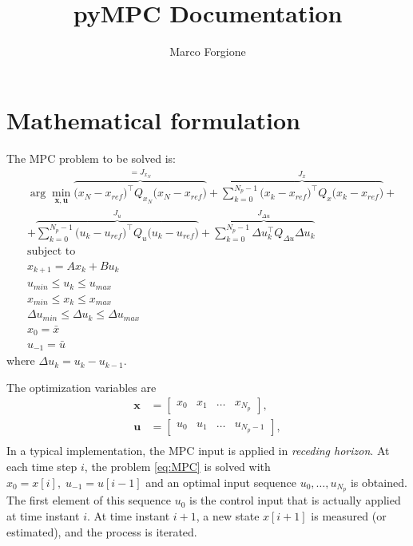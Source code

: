 \documentclass[a4paper,12pt,fleqn]{book}
\newcommand{\varx}{\mathbf{x}}
\newcommand{\varu}{\mathbf{u}}
\newcommand{\QxN}{Q_{x_N}}
\newcommand{\Qx}{Q_{x}}
\newcommand{\Qu}{Q_{u}}
\newcommand{\Qdu}{Q_{\Delta u}}
\newcommand{\Np}{{N_p}}
\begin{document}
 \title{pyMPC Documentation}
\author{Marco Forgione}

\maketitle

\chapter{Mathematical formulation}
The MPC problem to be solved is:
\begin{subequations}
\label{eq:MPC}
\begin{align}
  &\arg \min_{\varx,\varu} 
  \overbrace{\big(x_N - x_{ref}\big)^\top \QxN \big(x_N - x_{ref}\big)}^{=J_{x_N}} + 
  \overbrace{\sum_{k=0}^{\Np-1} \big(x_k - x_{ref}\big)^\top \Qx\big(x_k - x_{ref}\big)}^{J_{x}}+ \nonumber \\
  &  + 
    \overbrace{\sum_{k=0}^{\Np-1} \big(u_k - u_{ref}\big)^\top \Qu \big(u_k - u_{ref}\big)}^{J_u}
    +  
  \overbrace{\sum_{k=0}^{\Np-1} \Delta u_k^\top \Qdu \Delta u_k}^{J_{\Delta u}} \\ \nonumber
  &\text{subject to} \nonumber\\
  &x_{k+1} = Ax_k + B u_k \label{eq:linear_dynamics} \\ 
  &u_{min} \leq u_k \leq u_{max}\\
  &x_{min} \leq x_k \leq x_{max}\\
  &\Delta u_{min} \leq \Delta u_k \leq \Delta u_{max}\\
  &x_0 = \bar x\\
  &u_{-1} = \bar u
\end{align}
\end{subequations} where $\Delta u_k = u_k - u_{k-1}$.

The optimization variables are 
\begin{align}
  \varx & = \begin{bmatrix}x_0 & x_1 & \dots & x_\Np\end{bmatrix},\\
  \varu & = \begin{bmatrix}u_0 & u_1 & \dots & u_{\Np-1}\end{bmatrix},\\  
\end{align}
In a typical implementation, the MPC input is applied in \emph{receding horizon}. At each time step $i$, the problem \eqref{eq:MPC} is solved with $x_0=x[i],\;u_{-1}=u[{i-1}]$ and an optimal input sequence $u_{0},\dots,u_{\Np}$ is obtained. The first element of this sequence $u_0$ is the control input that is actually applied at time instant $i$. At time instant $i+1$, a new state $x[i+1]$ is measured (or estimated), and the process is iterated. 
\end{document}
